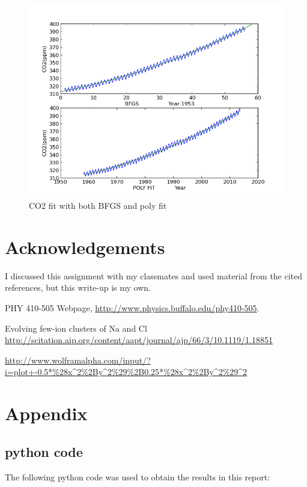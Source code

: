\documentclass[11pt,letterpaper]{article}
\begin{document}
\begin{figure}
\begin{center}
\includegraphics[width=0.8\linewidth,angle=0]{co2all.png}
\caption{CO2 fit with both BFGS and poly fit}
\label{figure9}
\end{center}
\end{figure}



\newpage
\section*{Acknowledgements}

I discussed this assignment with my classmates and used material from the
cited references, but this write-up is my own.

\begin{thebibliography}{9}


PHY 410-505 Webpage, \url{http://www.physics.buffalo.edu/phy410-505}.



Evolving few-ion clusters of Na and Cl 
\url{http://scitation.aip.org/content/aapt/journal/ajp/66/3/10.1119/1.18851}

\url{http://www.wolframalpha.com/input/?i=plot+-0.5*%28x^2%2By^2%29%2B0.25*%28x^2%2By^2%29^2}

\end{thebibliography}

\newpage
\appendix
\section{Appendix}

\subsection{python code}

The following python code was used to obtain the results in this report:






\end{document}
